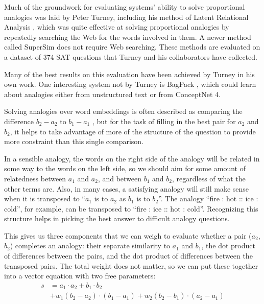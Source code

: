 \documentclass[letterpaper]{article}
\begin{document}
Much of the groundwork for evaluating systems' ability to solve proportional
analogies was laid by Peter Turney, including his method of Latent Relational
Analysis \cite{turney2006lra}, which was quite effective at solving
proportional analogies by repeatedly searching the Web for the words involved
in them. A newer method called SuperSim \cite{turney2013supersim} does
not require Web searching. These methods are evaluated on a dataset of 374 SAT
questions that Turney and his collaborators have collected.

Many of the best results on this evaluation have been achieved by Turney in his
own work. One interesting system not by Turney is BagPack
\cite{herdagdelen2009bagpack}, which could learn about analogies either from
unstructured text or from ConceptNet 4.

Solving analogies over word embeddings is often described as comparing the
difference $b_2 - a_2$ to $b_1 - a_1$ \cite{mikolov2013word2vec}, but for the
task of filling in the best pair for $a_2$ and $b_2$, it helps to take
advantage of more of the structure of the question to provide more constraint
than this single comparison.

In a sensible analogy, the words on the right side of the analogy will be
related in some way to the words on the left side, so we should aim for some
amount of relatedness between $a_1$ and $a_2$, and between $b_1$ and $b_2$,
regardless of what the other terms are. Also, in many cases, a satisfying
analogy will still make sense when it is transposed to ``$a_1$ is to $a_2$ as
$b_1$ is to $b_2$''. The analogy ``fire : hot :: ice : cold'', for example, can
be transposed to ``fire : ice :: hot : cold''. Recognizing this structure helps
in picking the best answer to difficult analogy questions.

This gives us three components that we can weigh to evaluate whether a pair
($a_2$, $b_2$) completes an analogy: their separate similarity to $a_1$ and
$b_1$, the dot product of differences between the pairs, and the dot product of
differences between the transposed pairs.  The total weight does not matter, so
we can put these together into a vector equation with two free parameters:
\begin{equation*}
    \begin{split}
        s &= a_1 \cdot a_2 + b_1 \cdot b_2\\
          &  + w_1(b_2 - a_2) \cdot (b_1 - a_1)
             + w_2(b_2 - b_1) \cdot (a_2 - a_1)
    \end{split}
\end{equation*}
\end{document}

